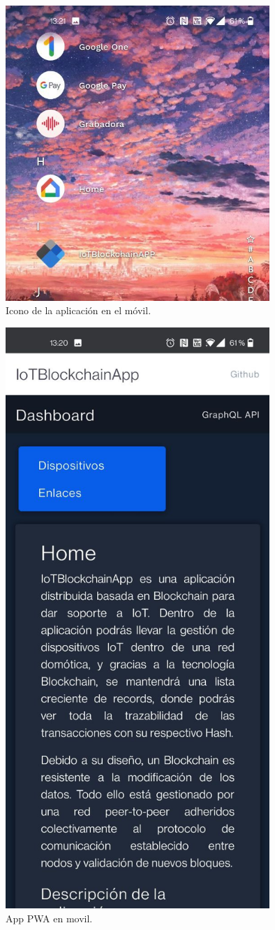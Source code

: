 \begin{figure}[ht!]
  \centering
  \includegraphics[width=10cm]{imagenes/desarrollo/web/pwa/icon_app}
  \caption{Icono de la aplicación en el móvil.}
  \label{fig:icon-app}
\end{figure}

\begin{figure}[ht!]
  \centering
  \includegraphics[width=10cm]{imagenes/desarrollo/web/pwa/app_movil}
  \caption{App PWA en movil.}
  \label{fig:app-movil}
\end{figure}

\newpage